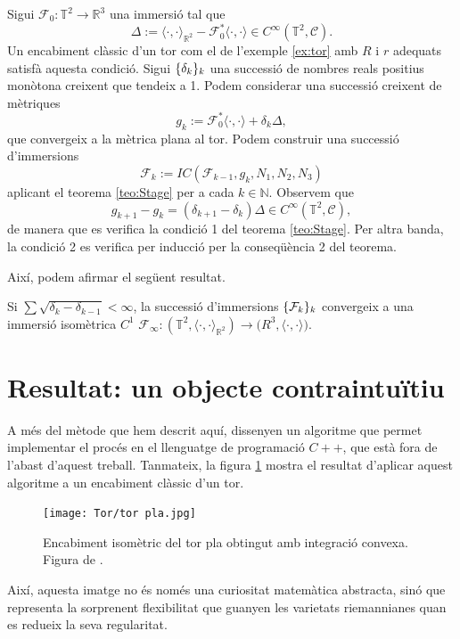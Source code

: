Sigui $\mathcal F_0:\mathbb T^2\to\mathbb R^3$ una immersió tal que
\begin{equation*}
    \Delta := \langle\cdot, \cdot\rangle_{\mathbb R^2} - \mathcal F_0^*\langle\cdot, \cdot\rangle\in C^\infty(\mathbb T^2, \mathcal C).
\end{equation*}
Un encabiment clàssic d'un tor com el de l'exemple \ref{ex:tor} amb $R$ i $r$ adequats satisfà aquesta condició. Sigui $\{\delta_k\}_k$ una successió de nombres reals positius monòtona creixent que tendeix a 1. Podem considerar una successió creixent de mètriques
\begin{equation*}
    g_k := \mathcal F_0^*\langle\cdot, \cdot\rangle + \delta_k\Delta,
\end{equation*}
que convergeix a la mètrica plana al tor. Podem construir una successió d'immersions
\begin{equation*}
    \mathcal F_k := IC(\mathcal F_{k-1}, g_k, N_1, N_2, N_3)
\end{equation*}
aplicant el teorema \ref{teo:Stage} per a cada $k\in\mathbb N$. Observem que
\begin{equation*}
    g_{k+1} - g_k = (\delta_{k+1}-\delta_k)\Delta\in C^\infty(\mathbb T^2, \mathcal C),
\end{equation*}
de manera que es verifica la condició 1 del teorema \ref{teo:Stage}. Per altra banda, la condició 2 es verifica per inducció per la conseqüència 2 del teorema.

Així, podem afirmar el següent resultat.
\begin{teo}
    Si $\sum\sqrt{\delta_k-\delta_{k-1}}<\infty$, la successió d'immersions $\{\mathcal F_k\}_k$ convergeix a una immersió isomètrica $C^1$ $\mathcal F_\infty:(\mathbb T^2, \langle\cdot, \cdot\rangle_{\mathbb R^2})\to\mathbb (R^3, \langle\cdot, \cdot\rangle)$.
\end{teo}

\section{Resultat: un objecte contraintuïtiu}
A més del mètode que hem descrit aquí, \citet{borrelli2013} dissenyen un algoritme que permet implementar el procés en el llenguatge de programació $C++$, que està fora de l'abast d'aquest treball. Tanmateix, la figura \ref{fig:tor_pl} mostra el resultat d'aplicar aquest algoritme a un encabiment clàssic d'un tor.
\begin{figure}[h!]
    \centering
    \texttt{[image: Tor/tor pla.jpg]}
    \caption{Encabiment isomètric del tor pla obtingut amb integració convexa. Figura de \citet{borrelli2013}.}
    \label{fig:tor_pl} 
\end{figure}

Així, aquesta imatge no és només una curiositat matemàtica abstracta, sinó que representa la sorprenent flexibilitat que guanyen les varietats riemannianes quan es redueix la seva regularitat.